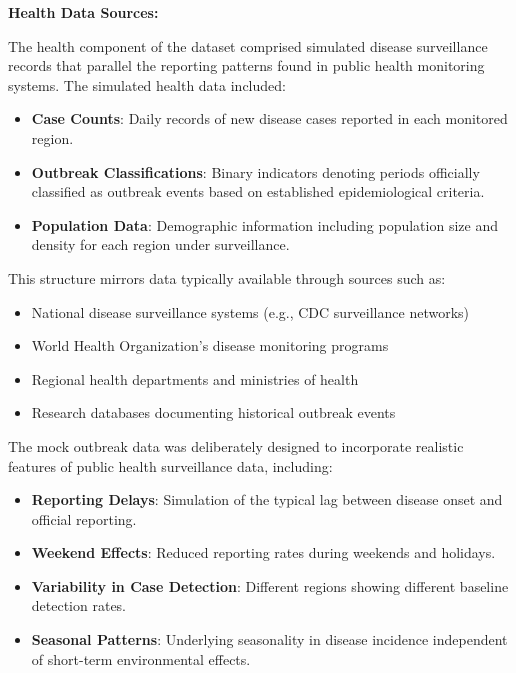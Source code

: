 \documentclass[12pt,a4paper]{report}
\begin{document}
\textbf{Health Data Sources:}

The health component of the dataset comprised simulated disease surveillance records that parallel the reporting patterns found in public health monitoring systems. The simulated health data included:

\begin{itemize}
    \item \textbf{Case Counts}: Daily records of new disease cases reported in each monitored region.
    \item \textbf{Outbreak Classifications}: Binary indicators denoting periods officially classified as outbreak events based on established epidemiological criteria.
    \item \textbf{Population Data}: Demographic information including population size and density for each region under surveillance.
\end{itemize}

This structure mirrors data typically available through sources such as:

\begin{itemize}
    \item National disease surveillance systems (e.g., CDC surveillance networks)
    \item World Health Organization's disease monitoring programs
    \item Regional health departments and ministries of health
    \item Research databases documenting historical outbreak events
\end{itemize}

The mock outbreak data was deliberately designed to incorporate realistic features of public health surveillance data, including:

\begin{itemize}
    \item \textbf{Reporting Delays}: Simulation of the typical lag between disease onset and official reporting.
    \item \textbf{Weekend Effects}: Reduced reporting rates during weekends and holidays.
    \item \textbf{Variability in Case Detection}: Different regions showing different baseline detection rates.
    \item \textbf{Seasonal Patterns}: Underlying seasonality in disease incidence independent of short-term environmental effects.
\end{itemize}
\end{document}
